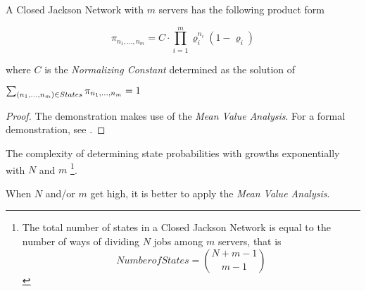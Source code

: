 \begin{theorem}
\label{thm:Batch-Jackson-Network-Product-Form}	
	A Closed Jackson Network with $m$ servers has the following product form
	
	\begin{equation}
	\label{eqn:Batch-Jackson-Network-Product-Form}
	\pi_{n_{1},...,n_{m}} = C \cdot \prod_{i=1}^{m} \varrho_{i}^{n_{i}} (1-\varrho_{i})
	\end{equation}
	
	where $C$ is the \textit{Normalizing Constant} determined as the solution of 
	
	$
	\sum_{(n_{1},...,n_{m}) \\ \in States} \pi_{n_{1},...,n_{m}} = 1
	$
	
	\begin{proof}
		The demonstration makes use of the \textit{Mean Value Analysis}.
		For a formal demonstration, see \cite{harchol2013performance}.
	\end{proof}
\end{theorem}

The complexity of determining state probabilities with  growths exponentially with $N$ and $m$
\footnote{The total number of states in a Closed Jackson Network is equal to the number of ways of dividing $N$ jobs among $m$ servers, that is
	\begin{equation*}
	\label{eqn:Batch-Jackson-Networks-Number-States}
	Number \! of \! States = \binom{N+m-1}{m-1}
	\end{equation*}
}.

When $N$ and/or $m$ get high, it is better to apply the \textit{Mean Value Analysis}.